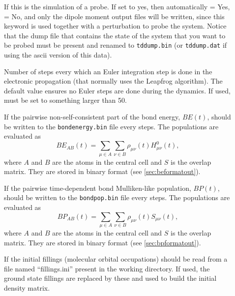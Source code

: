 \begin{description}
\item[] If this is the simulation of a probe. If set to yes,
  then automatically  = Yes,  = No, and
  only the dipole moment output files will be written, since this
  keyword is used together with a  perturbation to probe the
  system. Notice that the dump file that contains the state of the
  system that you want to be probed must be present and renamed to
  \verb|tddump.bin| (or \verb|tddump.dat| if using the ascii
  version of this data).

\item[] Number of steps every which an Euler
  integration step is done in the electronic propagation (that
  normally uses the Leapfrog algorithm). The default value ensures no
  Euler steps are done during the dynamics. If used, must be set to
  something larger than 50.

\item[] If the pairwise non-self-consistent part of the bond
  energy, $BE(t)$, should be written to the \verb|bondenergy.bin| file every
   steps. The populations are evaluated as
  \begin{equation*}
    BE_{AB}(t) = \sum_{\mu \in A} \sum_{\nu \in B} \rho_{\mu \nu}(t) H^0_{\mu
      \nu}(t),
  \end{equation*}
  where $A$ and $B$ are the atoms in the central cell and $S$ is the overlap
  matrix. They are stored in binary format (see \ref{sec:beformatout}).

\item[] If the pairwise time-dependent bond
  Mulliken-like population,  $BP(t)$, should be written
  to the \verb|bondpop.bin| file every  steps. The
  populations are evaluated as
  \begin{equation*}
    BP_{AB} (t) = \sum_{\mu \in A} \sum_{\nu \in B} \rho_{\mu \nu}(t) S_{\mu
      \nu}(t),
  \end{equation*}
  where $A$ and $B$ are the atoms in the central cell and $S$ is the overlap
  matrix. They are stored in binary format (see \ref{sec:bpformatout}).

\item[] If the initial fillings (molecular
  orbital occupations) should be read from a file named
  ``fillings.ini'' present in the working directory. If used, the
  ground state fillings are replaced by these and used to build the
  initial density matrix.

\end{description}

